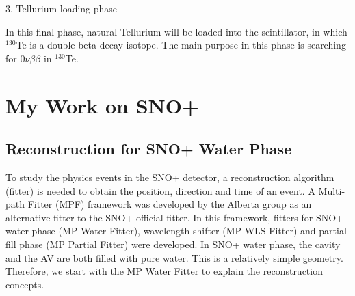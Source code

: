\documentclass[preprint,12pt]{elsarticle}
\numberwithin{equation}{section}
\begin{document}
3. Tellurium loading phase

In this final phase, natural Tellurium will be loaded into the scintillator, in which $^{130}$Te is a double beta decay isotope. The main purpose in this phase is searching for $0\nu\beta\beta$ in $^{130}$Te.

\section{My Work on SNO+}
\subsection{Reconstruction for SNO+ Water Phase}\label{reconsection}
To study the physics events in the SNO+ detector, a reconstruction algorithm (fitter) is needed to obtain the position, direction and time of an event. A Multi-path Fitter (MPF) framework was developed by the Alberta group as an alternative fitter to the SNO+ official fitter. In this framework, fitters for SNO+ water phase (MP Water Fitter), wavelength shifter (MP WLS Fitter) and partial-fill phase (MP Partial Fitter) were developed. In SNO+ water phase, the cavity and the AV are both filled with pure water. This is a relatively simple geometry. Therefore, we start with the MP Water Fitter to explain the reconstruction concepts.
\end{document}
